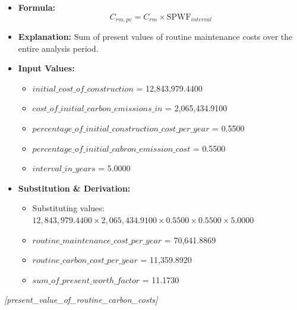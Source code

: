 \documentclass[12pt,a4paper]{article}
\begin{document}
\begin{itemize}
  \item \textbf{Formula:} $$C_{rm,pv} = C_{rm} \times \text{SPWF}_{interval}$$
  \item \textbf{Explanation:} Sum of present values of routine maintenance costs over the entire analysis period.
  \item \textbf{Input Values:}
  \begin{itemize}
    \item $initial\_cost\_of\_construction$ = 12,843,979.4400
    \item $cost\_of\_initial\_carbon\_emissions\_in$ = 2,065,434.9100
    \item $percentage\_of\_initial\_construction\_cost\_per\_year$ = 0.5500
    \item $percentage\_of\_initial\_cabron\_emission\_cost$ = 0.5500
    \item $interval\_in\_years$ = 5.0000
  \end{itemize}
  \item \textbf{Substitution \& Derivation:}
  \begin{itemize}
    \item Substituting values: $12,843,979.4400 \times 2,065,434.9100 \times 0.5500 \times 0.5500 \times 5.0000$
    \item $routine\_maintenance\_cost\_per\_year$ = 70,641.8869
    \item $routine\_carbon\_cost\_per\_year$ = 11,359.8920
    \item $sum\_of\_present\_worth\_factor$ = 11.1730
  \end{itemize}
\end{itemize}


\textit{[present\_value\_of\_routine\_carbon\_costs]}
\end{document}
